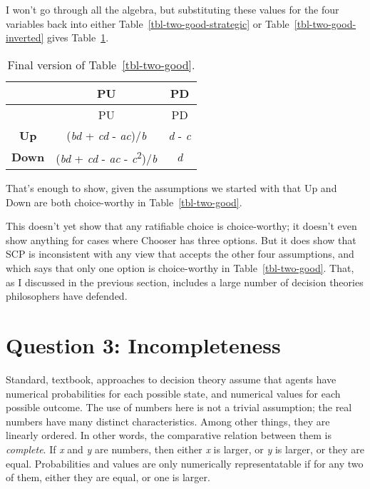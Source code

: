 \documentclass[
  10pt,
  letterpaper,
  DIV=11,
  numbers=noendperiod,
  twoside]{scrartcl}
\begin{document}
I won't go through all the algebra, but substituting these values for
the four variables back into either Table~\ref{tbl-two-good-strategic}
or Table~\ref{tbl-two-good-inverted} gives
Table~\ref{tbl-two-good-final}.

\begin{longtable}[]{@{}ccc@{}}
\caption{Final version of
Table~\ref{tbl-two-good}.}\label{tbl-two-good-final}\tabularnewline
\toprule\noalign{}
& PU & PD \\
\midrule\noalign{}
\endfirsthead
\toprule\noalign{}
& PU & PD \\
\midrule\noalign{}
\endhead
\bottomrule\noalign{}
\endlastfoot
\textbf{Up} & (\emph{bd} + \emph{cd} - \emph{ac})/\emph{b} & \emph{d} -
\emph{c} \\
\textbf{Down} & (\emph{bd} + \emph{cd} - \emph{ac} -
\emph{c}\textsuperscript{2})/\emph{b} & \emph{d} \\
\end{longtable}

That's enough to show, given the assumptions we started with that Up and
Down are both choice-worthy in Table~\ref{tbl-two-good}.

This doesn't yet show that any ratifiable choice is choice-worthy; it
doesn't even show anything for cases where Chooser has three options.
But it does show that SCP is inconsistent with any view that accepts the
other four assumptions, and which says that only one option is
choice-worthy in Table~\ref{tbl-two-good}. That, as I discussed in the
previous section, includes a large number of decision theories
philosophers have defended.

\section{Question 3: Incompleteness}\label{sec-incompleteness}

Standard, textbook, approaches to decision theory assume that agents
have numerical probabilities for each possible state, and numerical
values for each possible outcome. The use of numbers here is not a
trivial assumption; the real numbers have many distinct characteristics.
Among other things, they are linearly ordered. In other words, the
comparative relation between them is \emph{complete}. If \emph{x} and
\emph{y} are numbers, then either \emph{x} is larger, or \emph{y} is
larger, or they are equal. Probabilities and values are only numerically
representatable if for any two of them, either they are equal, or one is
larger.
\end{document}
